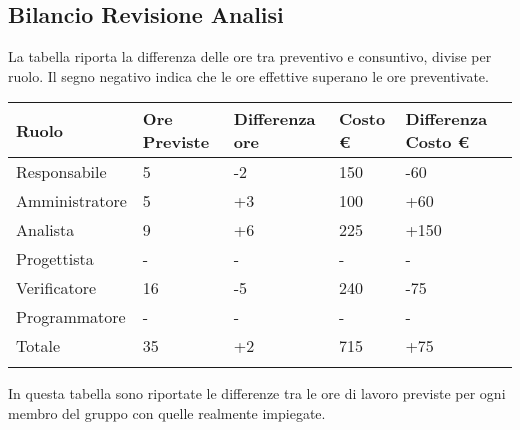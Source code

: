 \begin{flushleft}
    \newpage
    \section{Bilancio Revisione Analisi}
     La tabella riporta la differenza delle ore tra preventivo e consuntivo, divise per ruolo. Il segno negativo indica che le ore effettive superano le ore preventivate.  

     \begin{tabularx}{\textwidth}{|l|l|l|l|l|}
	\hline
	Ruolo              & Ore Previste& Differenza ore & Costo \euro & Differenza Costo \euro \\ \hline
	Responsabile            & 5       & -2  & 150 &  -60 \\ \hline
	Amministratore         & 5       & +3  & 100  &+60 \\ \hline
	Analista                   & 9         & +6   & 225 & +150  \\ \hline
	Progettista              &-           &-  & -  & - \\ \hline
	Verificatore             & 16        &-5  & 240 & -75 \\ \hline
	Programmatore         & -        &-   & -  & - \\ \hline
	Totale                         & 35     &+2   & 715 & +75\\ \hline
	\caption{Differenza delle ore tra preventivo e consultivo divise per ruolo}    
    \end{tabularx}


In questa tabella  sono riportate le differenze tra le ore di lavoro previste per ogni membro del gruppo con quelle realmente impiegate.\\


\end{flushleft}
